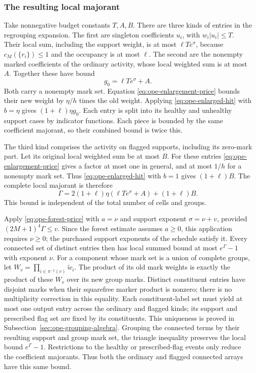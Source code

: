 \subsubsection{The resulting local majorant}
Take nonnegative budget constants $T,A,B$. There are three kinds of
entries in the regrouping expansion. The
first are singleton coefficients $u_i$, with $w_i|u_i|\leq T$.
Their local sum, including the support weight, is at most
$\ell T e^\sigma$, because $c_M(\{r_i\})\leq1$ and the occupancy
is at most $\ell$. The second are the nonempty marked coefficients
of the ordinary activity, whose local weighted sum is at most $A$.
Together these have bound
\[
 g_0=\ell T e^\sigma+A.
\]
Both carry a nonempty mark set. Equation
\eqref{eq:ope-enlargement-price} bounds their new weight by
$\eta/h$ times the old weight. Applying
\eqref{eq:ope-enlarged-hit} with $b=\eta$ gives
$(1+\ell)\eta g_0$. Each entry is split into its healthy and unhealthy
support cases by indicator functions. Each piece is bounded by the
same coefficient majorant, so their combined bound is twice this.

The third kind comprises the activity on flagged supports, including
its zero-mark part. Let its original local weighted sum be at most
$B$. For these entries \eqref{eq:ope-enlargement-price} gives a
factor at most one in general, and at most $1/h$ for a nonempty mark
set. Thus \eqref{eq:ope-enlarged-hit} with $b=1$ gives
$(1+\ell)B$. The complete local majorant is therefore
\begin{equation}\label{eq:ope-group-majorant}
 \Gamma=2(1+\ell)\eta(\ell T e^\sigma+A)+(1+\ell)B.
\end{equation}
This bound is independent of the total number of cells and groups.

Apply \eqref{eq:ope-forest-price} with $a=\nu$ and support exponent
$\sigma=\nu+v$, provided $(2M+1)^4\Gamma\leq v$. Since the forest
estimate assumes $a\geq0$, this application requires $\nu\geq0$; the
purchased support exponents of the schedule satisfy it.
Every connected set of distinct entries then has local summed bound
at most $e^\Gamma-1$ with exponent $\nu$.
For a component whose mark set is a union of complete groups, let
$W_v=\prod_{i\in\pi^{-1}(v)}\widetilde w_i$.
The product of its old mark weights is exactly the product of these
$W_v$ over its new group marks. Distinct constituent entries have
disjoint marks when their squarefree marker product is nonzero;
there is no multiplicity correction in this equality. Each constituent-label set must yield at most one output entry across
the ordinary and flagged kinds; its support and prescribed flag set
are fixed by its constituents. This uniqueness is proved in
Subsection~\ref{sec:ope-grouping-algebra}. Grouping the
connected terms by their resulting support and group mark set, the
triangle inequality preserves the local bound $e^\Gamma-1$.
Restrictions to the healthy or prescribed-flag events only reduce
the coefficient majorants. Thus both the ordinary and flagged
connected arrays have this same bound.

